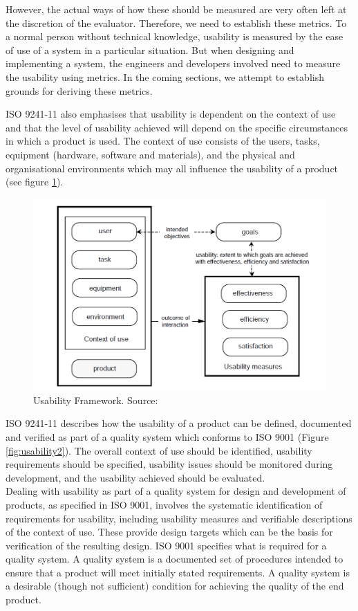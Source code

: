However, the actual ways of how these should be measured are very often left at the
discretion of the evaluator. Therefore, we need to establish these metrics. To a normal
person without technical knowledge, usability is measured by the ease of use of a system in a
particular situation. But when designing and implementing a system, the engineers and
developers involved need to measure the usability using metrics. In the coming sections, we attempt to
establish grounds for deriving these metrics.

\medskip

ISO 9241-11 also emphasises that usability is dependent on the context of use and that the
level of usability achieved will depend on the specific circumstances in which a product is
used. The context of use consists of the users, tasks, equipment (hardware, software and
materials), and the physical and organisational environments which may all influence the
usability of a product (see figure \ref{fig:usability1}).

\begin{figure}[H]
\caption{Usability Framework. Source: \cite{bevan1995human}}
\label{fig:usability1}
\includegraphics[scale=0.285]{img/usability1.png}
\end{figure} 

ISO 9241-11 describes how the usability of a product can be defined, documented and
verified as part of a quality system which conforms to ISO 9001 (Figure \ref{fig:usability2}). The overall context of use should be identified, usability requirements should be specified, usability issues should be monitored during development, and the usability achieved should be evaluated. \\
Dealing with usability as part of a quality system for design and development of products, as specified in ISO 9001, involves the systematic identification of requirements for usability, including usability measures and verifiable descriptions of the context of use. These provide design targets which can be the basis for verification of the resulting design. ISO 9001 specifies what is required for a quality system. A quality system is a documented set of procedures intended to ensure that a product will meet initially stated requirements. A quality system is a desirable (though not sufficient) condition for achieving the quality of the end product. 

